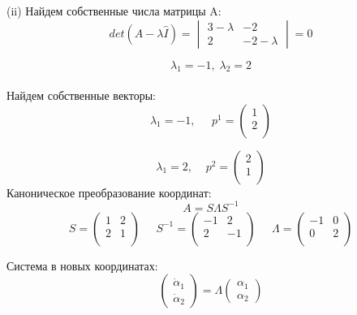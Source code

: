 \documentclass[a4paper, 12pt]{article}
\begin{document}
(ii) Найдем собственные числа матрицы A:
\[det(A-\lambda \hat{I})=
\begin{vmatrix}
3-\lambda & -2 \\
2 & -2-\lambda
\end{vmatrix}
=0\]

\[\lambda_1=-1, \; \lambda_2=2\]
\\Найдем собственные векторы:
\[\lambda_1=-1,\;\;\;\;\; p^1=
\left(
\begin{array}{cc}
1\\
2\\
\end{array}
\right)
\]



\[\lambda_1=2,\;\;\;\; p^2=
\left(
\begin{array}{cc}
2\\
1\\
\end{array}
\right)
\]
Каноническое преобразование координат:
\[A = S\Lambda S^{-1}\]
\[
S = \left(
\begin{array}{cc}
1 & 2\\
2 & 1\\
\end{array}
\right)\;\;\;\;\;
S^{-1} = \left(
\begin{array}{cc}
-1 & 2\\
2 & -1\\
\end{array}\right)\;\;\;\;\;
\Lambda = \left(
\begin{array}{cc}
-1 & 0\\
0 & 2\\
\end{array}\right)
\]

Система в новых координатах:
\[\left(
\begin{array}{c}
\dot{\alpha}_1\\
\dot{\alpha}_2
\end{array}
\right)=\Lambda\left(
\begin{array}{c}
{\alpha}_1 \\
{\alpha}_2
\end{array}
\right)\]
\end{document}
